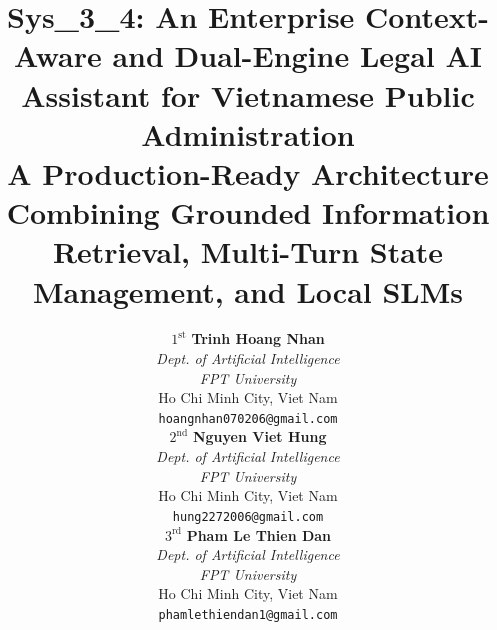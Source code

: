 \documentclass[11pt,a4paper]{article}
\begin{document}
\title{\textbf{Sys\_3\_4: An Enterprise Context-Aware and Dual-Engine Legal AI Assistant for Vietnamese Public Administration}\\
\large A Production-Ready Architecture Combining Grounded Information Retrieval, Multi-Turn State Management, and Local SLMs}

\author{
\begin{minipage}[t]{0.32\textwidth}
\centering
{\small $1^{\text{st}}$ \textbf{Trinh Hoang Nhan}}\\
\vspace{1pt}
{\scriptsize \textit{Dept. of Artificial Intelligence}}\\
{\scriptsize \textit{FPT University}}\\
{\scriptsize Ho Chi Minh City, Viet Nam}\\
\vspace{2pt}
{\scriptsize \texttt{hoangnhan070206@gmail.com}}
\end{minipage}
\hfill
\begin{minipage}[t]{0.32\textwidth}
\centering
{\small $2^{\text{nd}}$ \textbf{Nguyen Viet Hung}}\\
\vspace{1pt}
{\scriptsize \textit{Dept. of Artificial Intelligence}}\\
{\scriptsize \textit{FPT University}}\\
{\scriptsize Ho Chi Minh City, Viet Nam}\\
\vspace{2pt}
{\scriptsize \texttt{hung2272006@gmail.com}}
\end{minipage}
\hfill
\begin{minipage}[t]{0.32\textwidth}
\centering
{\small $3^{\text{rd}}$ \textbf{Pham Le Thien Dan}}\\
\vspace{1pt}
{\scriptsize \textit{Dept. of Artificial Intelligence}}\\
{\scriptsize \textit{FPT University}}\\
{\scriptsize Ho Chi Minh City, Viet Nam}\\
\vspace{2pt}
{\scriptsize \texttt{phamlethiendan1@gmail.com}}
\end{minipage}
}

\date{}
\maketitle
\end{document}
